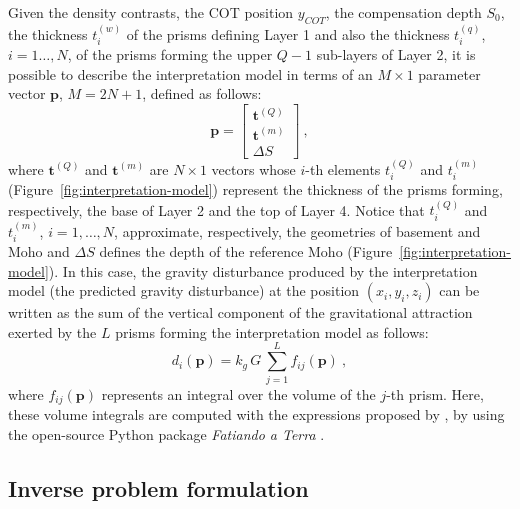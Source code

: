 \documentclass[manuscript,revised]{geophysics}
\begin{document}
Given the density contrasts, the COT position $y_{COT}$, the compensation
depth $S_{0}$, the thickness $t^{(w)}_{i}$ of the prisms defining Layer 1 and 
also the thickness $t^{(q)}_{i}$, $i = 1 \dots, N$, of the prisms forming the 
upper $Q-1$ sub-layers of Layer 2, it is possible to describe the interpretation
model in terms of an $M \times 1$ parameter vector $\mathbf{p}$, $M = 2N + 1$, defined
as follows:
\begin{equation}
\mathbf{p} = \begin{bmatrix}
\mathbf{t}^{(Q)} \\
\mathbf{t}^{(m)} \\
\Delta S
\end{bmatrix} \: ,
\label{eq:parameter-vector}
\end{equation}
where $\mathbf{t}^{(Q)}$ and $\mathbf{t}^{(m)}$ are $N \times 1$ vectors whose $i$-th
elements $t^{(Q)}_{i}$ and $t^{(m)}_{i}$ (Figure~\ref{fig:interpretation-model}) 
represent the thickness of the
prisms forming, respectively, the base of Layer 2 and the top of Layer 4.
Notice that $t^{(Q)}_{i}$ and $t^{(m)}_{i}$, $i = 1, \dots, N$, approximate, respectively, the 
geometries of basement and Moho and $\Delta S$ defines the depth of the
reference Moho (Figure~\ref{fig:interpretation-model}).
In this case, the gravity disturbance produced by the interpretation model (the
predicted gravity disturbance) at the position $(x_{i}, y_{i}, z_{i})$ can be written
as the sum of the vertical component of the gravitational attraction exerted by the $L$
prisms forming the interpretation model as follows:
\begin{equation}
d_{i}(\mathbf{p}) = k_{g} \, G \, \sum_{j = 1}^{L} f_{ij}(\mathbf{p}) \: ,
\label{eq:ith-predicted-data}
\end{equation}
where $f_{ij}(\mathbf{p})$ represents an integral over the volume of the $j$-th 
prism. Here, these volume integrals are computed with the expressions proposed 
by \citet{nagy-etal2000}, by using the open-source Python package 
\textit{Fatiando a Terra} \citep{uieda-etal2013}.


\subsection{Inverse problem formulation}
\end{document}
